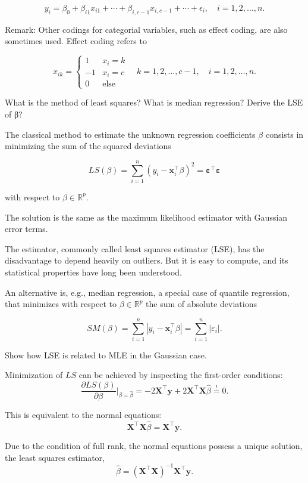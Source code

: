 \[
y_i = \beta_0 + \beta_{i1} x_{i1} + \cdots + \beta_{i, c-1} x_{i, c-1} + \cdots + \epsilon_i, \quad i = 1, 2, \ldots, n.
\]

Remark: Other codings for categorial variables, such as effect coding, are also sometimes used. Effect coding refers to

\[
x_{ik} =
\begin{cases} 
1 & x_i = k \\
-1 & x_i = c \\
0 & \text{else} 
\end{cases} \quad k = 1, 2, \ldots, c - 1, \quad i = 1, 2, \ldots, n.
\]


What is the method of least squares? What is median regression? Derive the LSE
of β?

The classical method to estimate the unknown regression coefficients \(\beta\) consists in minimizing the sum of the squared deviations

\[
LS(\beta) = \sum_{i=1}^{n} (y_i - \mathbf{x}_i^\top \beta)^2 = \mathbf{\varepsilon}^\top \mathbf{\varepsilon}
\]

with respect to \(\beta \in \mathbb{R}^p\).

The solution is the same as the maximum likelihood estimator with Gaussian error terms.

The estimator, commonly called least squares estimator (LSE), has the disadvantage to depend heavily on outliers. 
But it is easy to compute, and its statistical properties have long been understood.

An alternative is, e.g., median regression, a special case of quantile regression, that minimizes with respect to \(\beta \in \mathbb{R}^p\) the sum of absolute deviations

\[
SM(\beta) = \sum_{i=1}^{n} |y_i - \mathbf{x}_i^\top \beta| = \sum_{i=1}^{n} |\varepsilon_i|.
\]


Show how LSE is related to MLE in the Gaussian case.

Minimization of \(LS\) can be achieved by inspecting the first-order conditions:
\[
\frac{\partial LS(\beta)}{\partial \beta} \bigg|_{\beta = \hat{\beta}} = -2\mathbf{X}^\top \mathbf{y} + 2 \mathbf{X}^\top \mathbf{X} \hat{\beta} \stackrel{!}{=} 0.
\]

This is equivalent to the normal equations:
\[
\mathbf{X}^\top \mathbf{X} \hat{\beta} = \mathbf{X}^\top \mathbf{y}.
\]

Due to the condition of full rank, the normal equations possess a unique solution, the least squares estimator,
\[
\hat{\beta} = (\mathbf{X}^\top \mathbf{X})^{-1} \mathbf{X}^\top \mathbf{y}.
\]



